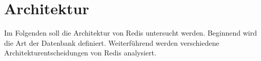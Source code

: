 
\section{Architektur}
Im Folgenden soll die Architektur von \acs{Redis} untersucht werden. Beginnend wird die Art der Datenbank definiert. Weiterführend werden verschiedene Architekturentscheidungen von \acs{Redis} analysiert. 
